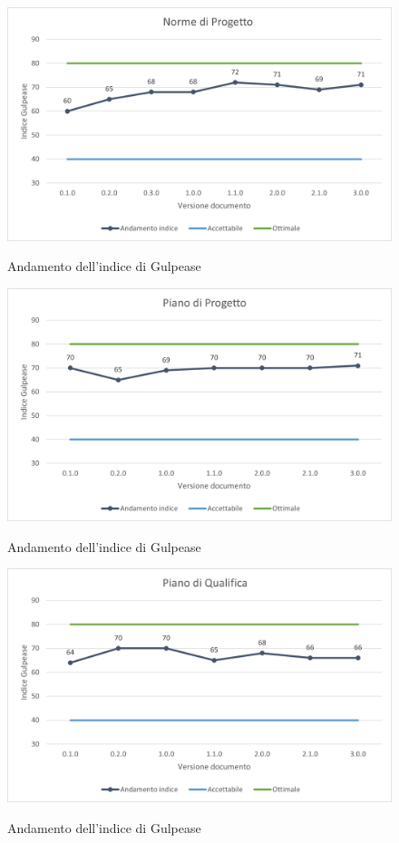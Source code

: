 \begin{figure}[H]
\centering
\includegraphics[scale=0.78]{res/ResocontoAttivitaDiVerifica/res/metriche/grafici/img/gulpeaseNDP.png}\\
\caption{Andamento dell'indice di Gulpease \NdP}
\end{figure}

\begin{figure}[H]
\centering
\includegraphics[scale=0.78]{res/ResocontoAttivitaDiVerifica/res/metriche/grafici/img/gulpeasePDP.png}\\
\caption{Andamento dell'indice di Gulpease \PdP}
\end{figure}

\begin{figure}[H]
\centering
\includegraphics[scale=0.78]{res/ResocontoAttivitaDiVerifica/res/metriche/grafici/img/gulpeasePDQ.png}\\
\caption{Andamento dell'indice di Gulpease \PdQ}
\end{figure}

